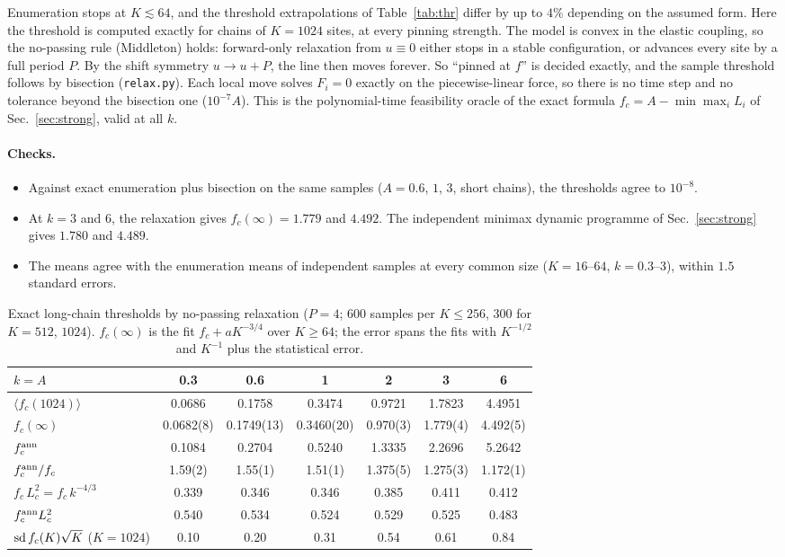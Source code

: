 \documentclass[10pt,a4paper]{article}
\begin{document}
Enumeration stops at $K\lesssim64$, and the threshold extrapolations of Table~\ref{tab:thr} differ by up to $4\%$ depending on the assumed form.
Here the threshold is computed exactly for chains of $K=1024$ sites, at every pinning strength.
The model is convex in the elastic coupling, so the no-passing rule (Middleton) holds: forward-only relaxation from $u\equiv0$ either stops in a stable configuration, or advances every site by a full period $P$. By the shift symmetry $u\to u+P$, the line then moves forever.
So ``pinned at $f$'' is decided exactly, and the sample threshold follows by bisection (\texttt{relax.py}).
Each local move solves $F_i=0$ exactly on the piecewise-linear force, so there is no time step and no tolerance beyond the bisection one ($10^{-7}A$).
This is the polynomial-time feasibility oracle of the exact formula $f_c=A-\min\max_iL_i$ of Sec.~\ref{sec:strong}, valid at all $k$.

\paragraph{Checks.}
\begin{itemize}
\item Against exact enumeration plus bisection on the same samples ($A=0.6$, $1$, $3$, short chains), the thresholds agree to $10^{-8}$.
\item At $k=3$ and $6$, the relaxation gives $f_c(\infty)=1.779$ and $4.492$. The independent minimax dynamic programme of Sec.~\ref{sec:strong} gives $1.780$ and $4.489$.
\item The means agree with the enumeration means of independent samples at every common size ($K=16$--$64$, $k=0.3$--$3$), within $1.5$ standard errors.
\end{itemize}

\begin{table}[H]
\centering\footnotesize
\begin{tabular}{lcccccc}
\toprule
$k=A$ & 0.3 & 0.6 & 1 & 2 & 3 & 6 \\
\midrule
$\langle f_c(1024)\rangle$ & 0.0686 & 0.1758 & 0.3474 & 0.9721 & 1.7823 & 4.4951 \\
$f_c(\infty)$ & 0.0682(8) & 0.1749(13) & 0.3460(20) & 0.970(3) & 1.779(4) & 4.492(5) \\
$f_c^{\rm ann}$ & 0.1084 & 0.2704 & 0.5240 & 1.3335 & 2.2696 & 5.2642 \\
$f_c^{\rm ann}/f_c$ & 1.59(2) & 1.55(1) & 1.51(1) & 1.375(5) & 1.275(3) & 1.172(1) \\
$f_c\,L_c^2=f_c\,k^{-4/3}$ & 0.339 & 0.346 & 0.346 & 0.385 & 0.411 & 0.412 \\
$f_c^{\rm ann}L_c^2$ & 0.540 & 0.534 & 0.524 & 0.529 & 0.525 & 0.483 \\
${\rm sd}\,f_c(K)\sqrt K$ ($K=1024$) & 0.10 & 0.20 & 0.31 & 0.54 & 0.61 & 0.84 \\
\bottomrule
\end{tabular}
\caption{Exact long-chain thresholds by no-passing relaxation ($P=4$; $600$ samples per $K\le256$, $300$ for $K=512$, $1024$). $f_c(\infty)$ is the fit $f_c+aK^{-3/4}$ over $K\ge64$; the error spans the fits with $K^{-1/2}$ and $K^{-1}$ plus the statistical error.}
\label{tab:relax}
\end{table}
\end{document}
